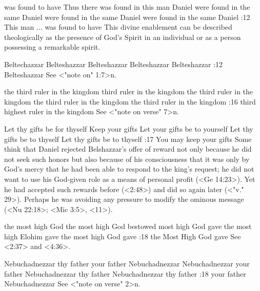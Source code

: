     {was found to have} %
    {Thus there was found in this man Daniel} %
    {were found in the same Daniel} %
    {were found in the same Daniel} %
    {were found in the same Daniel} %
:12 {This man ... was found to have} This divine enablement 
can be described theologically as the presence of God's Spirit in an 
individual or as a person possessing a remarkable spirit. 


    {Beltechazzar} %
    {Belteshazzar} %
    {Belteshazzar} %
    {Belteshazzar} %
    {Belteshazzar} %
:12 {Belteshazzar} See <"note on" 1:7>n.

    {the third ruler in the kingdom} %
    {third ruler in the kingdom} %
    {the third ruler in the kingdom} %
    {the third ruler in the kingdom} %
    {the third ruler in the kingdom} %
:16 {third highest ruler in the kingdom} See <"note on verse" 7>n.

    {Let thy gifts be for thyself} %
    {Keep your gifts} %
    {Let your gifts be to yourself} %
    {Let thy gifts be to thyself} %
    {Let thy gifts be to thyself} %
:17 {You may keep your gifts} Some think that Daniel rejected 
Belshazzar's offer of reward not only because he did not seek such 
honors but also because of his consciousness that it was only by 
God's mercy that he had been able to respond to the king's request; he did not want to use his
God-given role as a means of personal profit (<Ge 14:23>). Yet he had accepted such rewards before 
(<2:48>) and did so again later (<"v." 29>). Perhaps he was avoiding any 
pressure to modify the ominous message (<Nu 22:18>; <Mic 3:5>, <11>). 

    {the most high God} %
    {the most high God bestowed} %
    {most high God gave} %
    {the most high Elohim gave} %
    {the most high God gave} %
:18 {the Most High God gave} See <2:37> and <4:36>.

    {Nebuchadnezzar thy father} %
    {your father Nebuchadnezzar} %
    {Nebuchadnezzar your father} %
    {Nebuchadnezzar thy father} %
    {Nebuchadnezzar thy father} %
:18 {your father Nebuchadnezzar} See <"note on verse" 2>n.

